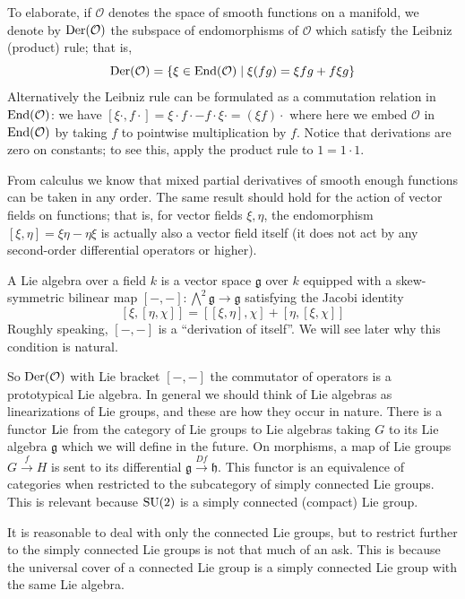 \documentclass[../../rtnotes.tex]{subfiles}
\begin{document}
To elaborate, if $\mathcal O$ denotes the space of smooth functions on a manifold, we denote by $\operatorname{Der}(\mathcal O)$ the subspace of endomorphisms of $\mathcal O$ which satisfy the Leibniz (product) rule; that is,
\[\operatorname{Der}(\mathcal O) = \{\xi\in \operatorname{End}(\mathcal O)\mid \xi(fg) = \xi fg + f\xi g\}\]
Alternatively the Leibniz rule can be formulated as a commutation relation in $\operatorname{End}(\mathcal O)$: we have $[\xi\cdot,f\cdot] = \xi\cdot f\cdot - f\cdot\xi\cdot = (\xi f)\cdot$ where here we embed $\mathcal O$ in $\operatorname{End}(\mathcal O)$ by taking $f$ to pointwise multiplication by $f$. Notice that derivations are zero on constants; to see this, apply the product rule to $1 = 1\cdot 1$.

From calculus we know that mixed partial derivatives of smooth enough functions can be taken in any order. The same result should hold for the action of vector fields on functions; that is, for vector fields $\xi,\eta$, the endomorphism $[\xi,\eta] = \xi\eta-\eta\xi$ is actually also a vector field itself (it does not act by any second-order differential operators or higher).

A Lie algebra over a field $k$ is a vector space $\mathfrak g$ over $k$ equipped with a skew-symmetric bilinear map $[-,-]\colon \bigwedge^2\mathfrak g\to \mathfrak g$ satisfying the Jacobi identity
\[[\xi,[\eta,\chi]] = [[\xi,\eta],\chi] + [\eta,[\xi,\chi]]\]
Roughly speaking, $[-,-]$ is a ``derivation of itself''. We will see later why this condition is natural.

So $\operatorname{Der}(\mathcal O)$ with Lie bracket $[-,-]$ the commutator of operators is a prototypical Lie algebra. In general we should think of Lie algebras as linearizations of Lie groups, and these are how they occur in nature. There is a functor $\operatorname{Lie}$ from the category of Lie groups to Lie algebras taking $G$ to its Lie algebra $\mathfrak g$ which we will define in the future. On morphisms, a map of Lie groups $G\xrightarrow{f}H$ is sent to its differential $\mathfrak g\xrightarrow{Df}\mathfrak h$. This functor is an equivalence of categories when restricted to the subcategory of simply connected Lie groups. This is relevant because $\operatorname{SU}(2)$ is a simply connected (compact) Lie group. 

It is reasonable to deal with only the connected Lie groups, but to restrict further to the simply connected Lie groups is not that much of an ask. This is because the universal cover of a connected Lie group is a simply connected Lie group with the same Lie algebra. 
\end{document}
